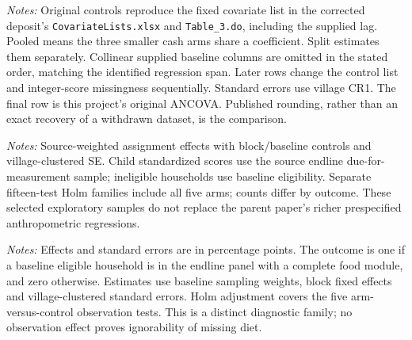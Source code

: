 \documentclass[11pt]{article}
\begin{document}
\begin{table}[htbp]
\centering\caption{Crosswalk from the original diet specification}\label{tab:crosswalk}
\resizebox{\textwidth}{!}{}
\begin{minipage}{\textwidth}\footnotesize
\emph{Notes:} Original controls reproduce the fixed covariate list in the corrected deposit's \texttt{CovariateLists.xlsx} and \texttt{Table\_3.do}, including the supplied lag. Pooled means the three smaller cash arms share a coefficient. Split estimates them separately. Collinear supplied baseline columns are omitted in the stated order, matching the identified regression span. Later rows change the control list and integer-score missingness sequentially. Standard errors use village CR1. The final row is this project's original ANCOVA. Published rounding, rather than an exact recovery of a withdrawn dataset, is the comparison.
\end{minipage}
\end{table}


\begin{table}[htbp]
\centering\caption{Available child growth and ineligible-household outcomes}\label{tab:populations}
\resizebox{\textwidth}{!}{}
\begin{minipage}{\textwidth}\footnotesize
\emph{Notes:} Source-weighted assignment effects with block/baseline controls and village-clustered SE. Child standardized scores use the source endline due-for-measurement sample; ineligible households use baseline eligibility. Separate fifteen-test Holm families include all five arms; counts differ by outcome. These selected exploratory samples do not replace the parent paper's richer prespecified anthropometric regressions.
\end{minipage}
\end{table}


\begin{table}[p]
\centering\caption{Assignment effects on observing an endline diet}\label{tab:retention}

\begin{minipage}{\textwidth}\footnotesize
\emph{Notes:} Effects and standard errors are in percentage points. The outcome is one if a baseline eligible household is in the endline panel with a complete food module, and zero otherwise. Estimates use baseline sampling weights, block fixed effects and village-clustered standard errors. Holm adjustment covers the five arm-versus-control observation tests. This is a distinct diagnostic family; no observation effect proves ignorability of missing diet.
\end{minipage}
\end{table}
\end{document}
